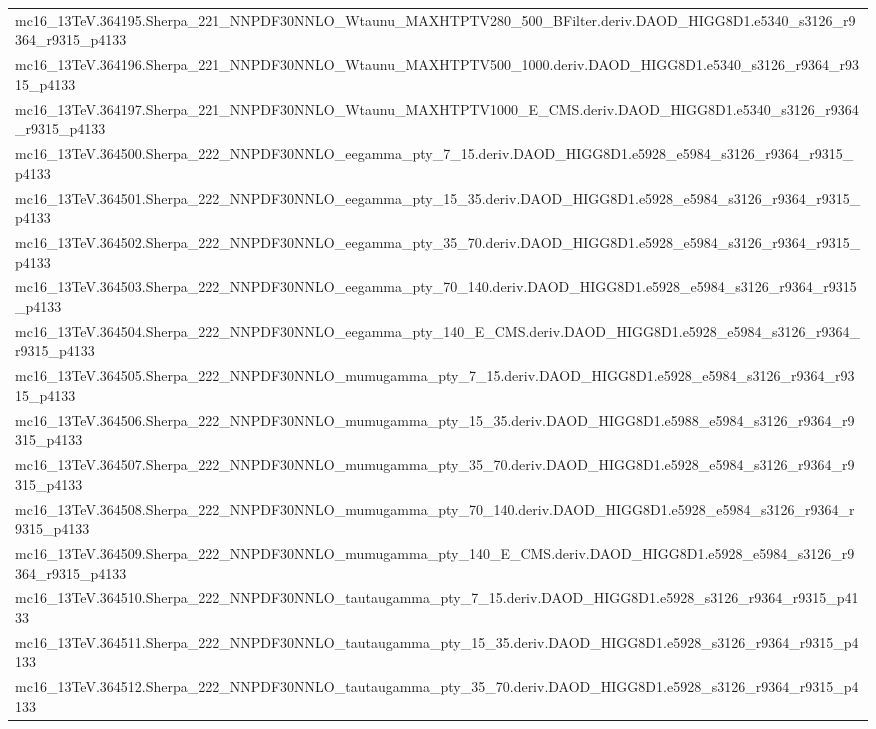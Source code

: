 \begin{adjustwidth}{-3em}{-3em}
\begin{longtable}{l}
mc16\_13TeV.364195.Sherpa\_221\_NNPDF30NNLO\_Wtaunu\_MAXHTPTV280\_500\_BFilter.deriv.DAOD\_HIGG8D1.e5340\_s3126\_r9364\_r9315\_p4133 \\
mc16\_13TeV.364196.Sherpa\_221\_NNPDF30NNLO\_Wtaunu\_MAXHTPTV500\_1000.deriv.DAOD\_HIGG8D1.e5340\_s3126\_r9364\_r9315\_p4133 \\
mc16\_13TeV.364197.Sherpa\_221\_NNPDF30NNLO\_Wtaunu\_MAXHTPTV1000\_E\_CMS.deriv.DAOD\_HIGG8D1.e5340\_s3126\_r9364\_r9315\_p4133 \\
mc16\_13TeV.364500.Sherpa\_222\_NNPDF30NNLO\_eegamma\_pty\_7\_15.deriv.DAOD\_HIGG8D1.e5928\_e5984\_s3126\_r9364\_r9315\_p4133 \\
mc16\_13TeV.364501.Sherpa\_222\_NNPDF30NNLO\_eegamma\_pty\_15\_35.deriv.DAOD\_HIGG8D1.e5928\_e5984\_s3126\_r9364\_r9315\_p4133 \\
mc16\_13TeV.364502.Sherpa\_222\_NNPDF30NNLO\_eegamma\_pty\_35\_70.deriv.DAOD\_HIGG8D1.e5928\_e5984\_s3126\_r9364\_r9315\_p4133 \\
mc16\_13TeV.364503.Sherpa\_222\_NNPDF30NNLO\_eegamma\_pty\_70\_140.deriv.DAOD\_HIGG8D1.e5928\_e5984\_s3126\_r9364\_r9315\_p4133 \\
mc16\_13TeV.364504.Sherpa\_222\_NNPDF30NNLO\_eegamma\_pty\_140\_E\_CMS.deriv.DAOD\_HIGG8D1.e5928\_e5984\_s3126\_r9364\_r9315\_p4133 \\
mc16\_13TeV.364505.Sherpa\_222\_NNPDF30NNLO\_mumugamma\_pty\_7\_15.deriv.DAOD\_HIGG8D1.e5928\_e5984\_s3126\_r9364\_r9315\_p4133 \\
mc16\_13TeV.364506.Sherpa\_222\_NNPDF30NNLO\_mumugamma\_pty\_15\_35.deriv.DAOD\_HIGG8D1.e5988\_e5984\_s3126\_r9364\_r9315\_p4133 \\
mc16\_13TeV.364507.Sherpa\_222\_NNPDF30NNLO\_mumugamma\_pty\_35\_70.deriv.DAOD\_HIGG8D1.e5928\_e5984\_s3126\_r9364\_r9315\_p4133 \\
mc16\_13TeV.364508.Sherpa\_222\_NNPDF30NNLO\_mumugamma\_pty\_70\_140.deriv.DAOD\_HIGG8D1.e5928\_e5984\_s3126\_r9364\_r9315\_p4133 \\
mc16\_13TeV.364509.Sherpa\_222\_NNPDF30NNLO\_mumugamma\_pty\_140\_E\_CMS.deriv.DAOD\_HIGG8D1.e5928\_e5984\_s3126\_r9364\_r9315\_p4133 \\
mc16\_13TeV.364510.Sherpa\_222\_NNPDF30NNLO\_tautaugamma\_pty\_7\_15.deriv.DAOD\_HIGG8D1.e5928\_s3126\_r9364\_r9315\_p4133 \\
mc16\_13TeV.364511.Sherpa\_222\_NNPDF30NNLO\_tautaugamma\_pty\_15\_35.deriv.DAOD\_HIGG8D1.e5928\_s3126\_r9364\_r9315\_p4133 \\
mc16\_13TeV.364512.Sherpa\_222\_NNPDF30NNLO\_tautaugamma\_pty\_35\_70.deriv.DAOD\_HIGG8D1.e5928\_s3126\_r9364\_r9315\_p4133 \\

\end{longtable}
\end{adjustwidth}
